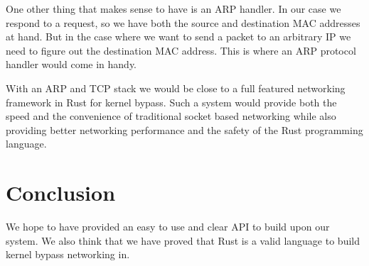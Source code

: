 \documentclass[11pt]{book}
\begin{document}
One other thing that makes sense to have is an ARP handler. In our
case we respond to a request, so we have both the source and
destination MAC addresses at hand. But in the case where we want to
send a packet to an arbitrary IP we need to figure out the destination
MAC address. This is where an ARP protocol handler would come in
handy. 

With an ARP and TCP stack we would be close to a full featured
networking framework in Rust for kernel bypass. Such a system would
provide both the speed and the convenience of traditional socket based
networking while also providing better networking performance and the
safety of the Rust programming language. 

\chapter{Conclusion}

We hope to have provided an easy to use and clear API to build upon
our system. We also think that we have proved that Rust is a valid
language to build kernel bypass networking in. 


{}
\end{document}
